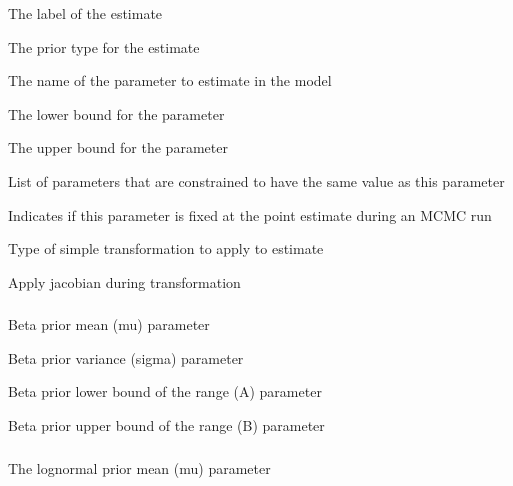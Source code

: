 
 {The label of the estimate}

 {The prior type for the estimate}

 {The name of the parameter to estimate in the model}

 {The lower bound for the parameter}

 {The upper bound for the parameter}

 {List of parameters that are constrained to have the same value as this parameter}

 {Indicates if this parameter is fixed at the point estimate during an MCMC run}

 {Type of simple transformation to apply to estimate}

 {Apply jacobian during transformation}

\subsubsection[Beta]{}

 {Beta prior  mean (mu) parameter}

 {Beta prior variance (sigma) parameter}

 {Beta prior lower bound of the range (A) parameter}

 {Beta prior upper bound of the range (B) parameter}

\subsubsection[Lognormal]{}

 {The lognormal prior mean (mu) parameter}

